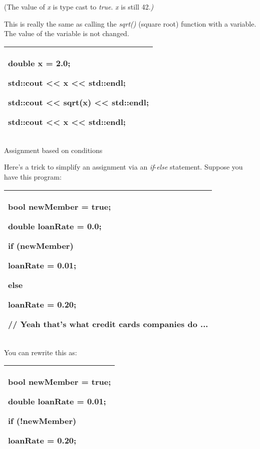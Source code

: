 \documentclass[
]{article}
\begin{document}
(The value of \emph{x} is type cast to \emph{true}. \emph{x} is still
42.\emph{)}

This is really the same as calling the \emph{sqrt()} (square root)
function with a variable. The value of the variable is not changed.

\begin{longtable}[]{@{}l@{}}
\toprule
\endhead
\begin{minipage}[t]{0.97\columnwidth}\raggedright
double x = 2.0;

std::cout \textless\textless{} x \textless\textless{} std::endl;

std::cout \textless\textless{} sqrt(x) \textless\textless{} std::endl;

std::cout \textless\textless{} x \textless\textless{} std::endl;\strut
\end{minipage}\tabularnewline
\bottomrule
\end{longtable}

Assignment based on conditions

Here's a trick to simplify an assignment via an \emph{if}-\emph{else}
statement. Suppose you have this program:

\begin{longtable}[]{@{}l@{}}
\toprule
\endhead
\begin{minipage}[t]{0.97\columnwidth}\raggedright
bool newMember = true;

double loanRate = 0.0;

if (newMember)

loanRate = 0.01;

else

loanRate = 0.20;

// Yeah that's what credit cards companies do ...\strut
\end{minipage}\tabularnewline
\bottomrule
\end{longtable}

You can rewrite this as:

\begin{longtable}[]{@{}l@{}}
\toprule
\endhead
\begin{minipage}[t]{0.97\columnwidth}\raggedright
bool newMember = true;

double loanRate = 0.01;

if (!newMember)

loanRate = 0.20;\strut
\end{minipage}\tabularnewline
\bottomrule
\end{longtable}
\end{document}
